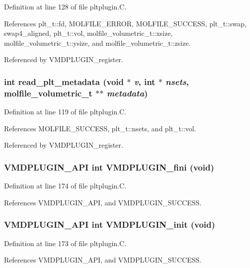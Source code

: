 Definition at line 128 of file pltplugin.C.

References plt\_\-t::fd, MOLFILE\_\-ERROR, MOLFILE\_\-SUCCESS, plt\_\-t::swap, swap4\_\-aligned, plt\_\-t::vol, molfile\_\-volumetric\_\-t::xsize, molfile\_\-volumetric\_\-t::ysize, and molfile\_\-volumetric\_\-t::zsize.

Referenced by VMDPLUGIN\_\-register.
\subsubsection{\setlength{\rightskip}{0pt plus 5cm}int read\_\-plt\_\-metadata (void $\ast$ {\em v}, int $\ast$ {\em nsets}, {\bf molfile\_\-volumetric\_\-t} $\ast$$\ast$ {\em metadata})\hspace{0.3cm}{\tt  [static]}}\label{pltplugin_8C_a2}




Definition at line 119 of file pltplugin.C.

References MOLFILE\_\-SUCCESS, plt\_\-t::nsets, and plt\_\-t::vol.

Referenced by VMDPLUGIN\_\-register.
\subsubsection{\setlength{\rightskip}{0pt plus 5cm}VMDPLUGIN\_\-API int VMDPLUGIN\_\-fini (void)}\label{pltplugin_8C_a6}




Definition at line 174 of file pltplugin.C.

References VMDPLUGIN\_\-API, and VMDPLUGIN\_\-SUCCESS.
\subsubsection{\setlength{\rightskip}{0pt plus 5cm}VMDPLUGIN\_\-API int VMDPLUGIN\_\-init (void)}\label{pltplugin_8C_a5}




Definition at line 173 of file pltplugin.C.

References VMDPLUGIN\_\-API, and VMDPLUGIN\_\-SUCCESS.
